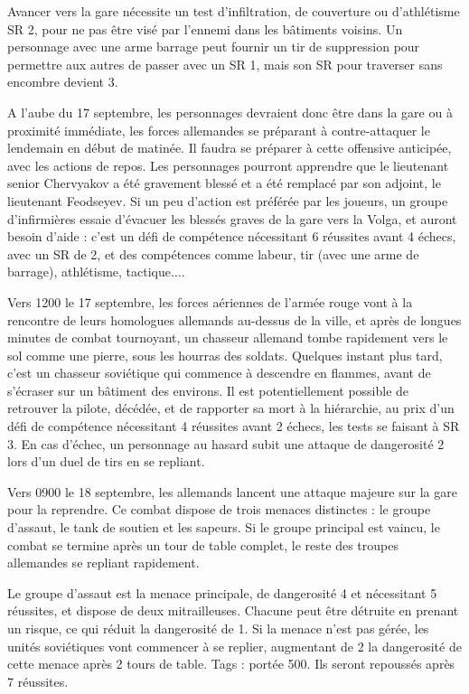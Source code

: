 \documentclass{report}
\begin{document}
\begin{multicols}{2}
Avancer vers la gare nécessite un test d'infiltration, de couverture ou d'athlétisme SR 2, pour ne pas être visé par l'ennemi dans les bâtiments voisins. Un personnage avec une arme barrage peut fournir un tir de suppression pour permettre aux autres de passer avec un SR 1, mais son SR pour traverser sans encombre devient 3.

A l'aube du 17 septembre, les personnages devraient donc être dans la gare ou à proximité immédiate, les forces allemandes se préparant à contre-attaquer le lendemain en début de matinée. Il faudra se préparer à cette offensive anticipée, avec les actions de repos. Les personnages pourront apprendre que le lieutenant senior Chervyakov a été gravement blessé et a été remplacé par son adjoint, le lieutenant Feodseyev. Si un peu d'action est préférée par les joueurs, un groupe d'infirmières essaie d'évacuer les blessés graves de la gare vers la Volga, et auront besoin d'aide : c'est un défi de compétence nécessitant 6 réussites avant 4 échecs, avec un SR de 2, et des compétences comme labeur, tir (avec une arme de barrage), athlétisme, tactique....

Vers 1200 le 17 septembre, les forces aériennes de l'armée rouge vont à la rencontre de leurs homologues allemands au-dessus de la ville, et après de longues minutes de combat tournoyant, un chasseur allemand tombe rapidement vers le sol comme une pierre, sous les hourras des soldats. Quelques instant plus tard, c'est un chasseur soviétique qui commence à descendre en flammes, avant de s'écraser sur un bâtiment des environs. Il est potentiellement possible de retrouver la pilote, décédée, et de rapporter sa mort à la hiérarchie, au prix d'un défi de compétence nécessitant 4 réussites avant 2 échecs, les tests se faisant à SR 3. En cas d'échec, un personnage au hasard subit une attaque de dangerosité 2 lors d'un duel de tirs en se repliant.

Vers 0900 le 18 septembre, les allemands lancent une attaque majeure sur la gare pour la reprendre. Ce combat dispose de trois menaces distinctes : le groupe d'assaut, le tank de soutien et les sapeurs. Si le groupe principal est vaincu, le combat se termine après un tour de table complet, le reste des troupes allemandes se repliant rapidement.

Le groupe d'assaut est la menace principale, de dangerosité 4 et nécessitant 5 réussites, et dispose de deux mitrailleuses. Chacune peut être détruite en prenant un risque, ce qui réduit la dangerosité de 1. Si la menace n'est pas gérée, les unités soviétiques vont commencer à se replier, augmentant de 2 la dangerosité de cette menace après 2 tours de table. Tags : portée 500. Ils seront repoussés après 7 réussites.


\end{multicols}
\end{document}
